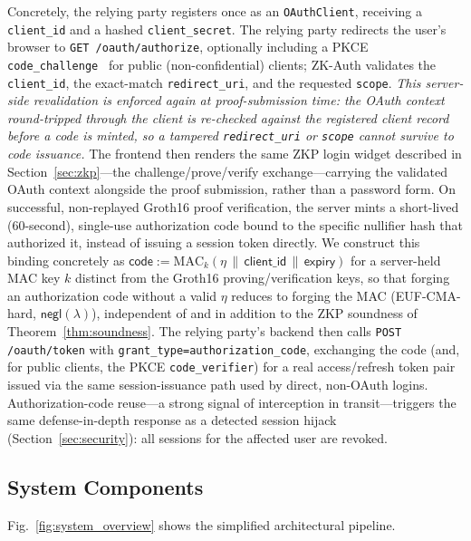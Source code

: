 \documentclass[journal,twoside,10pt]{IEEEtran}
\begin{document}
Concretely, the relying party registers once as an \texttt{OAuthClient},
receiving a \texttt{client\_id} and a hashed \texttt{client\_secret}.
The relying party redirects the user's browser to
\texttt{GET /oauth/authorize}, optionally including a PKCE
\texttt{code\_challenge}~\cite{rfc7636} for public (non-confidential)
clients; ZK-Auth validates the \texttt{client\_id}, the exact-match
\texttt{redirect\_uri}, and the requested \texttt{scope}. \emph{This
server-side revalidation is enforced again at proof-submission time: the
OAuth context round-tripped through the client is re-checked against the
registered client record before a code is minted, so a tampered
\texttt{redirect\_uri} or \texttt{scope} cannot survive to code issuance.}
The frontend then renders the same ZKP login widget described in
Section~\ref{sec:zkp}---the challenge/prove/verify exchange---carrying
the validated OAuth context alongside the proof submission, rather than
a password form. On successful, non-replayed Groth16 proof verification,
the server mints a short-lived (60-second), single-use authorization
code bound to the specific nullifier hash that authorized it, instead of
issuing a session token directly. We construct this binding concretely
as $\mathsf{code} := \mathrm{MAC}_k(\eta \,\|\, \mathsf{client\_id} \,\|\,
\mathsf{expiry})$ for a server-held MAC key $k$ distinct from the Groth16
proving/verification keys, so that forging an authorization code without
a valid $\eta$ reduces to forging the MAC (EUF-CMA-hard,
$\mathsf{negl}(\lambda)$), independent of and in addition to the ZKP
soundness of Theorem~\ref{thm:soundness}. The relying party's backend then
calls \texttt{POST /oauth/token} with
\texttt{grant\_type=authorization\_code}, exchanging the code (and, for
public clients, the PKCE \texttt{code\_verifier}) for a real
access/refresh token pair issued via the same session-issuance path used
by direct, non-OAuth logins. Authorization-code reuse---a strong signal
of interception in transit---triggers the same defense-in-depth response
as a detected session hijack (Section~\ref{sec:security}): all sessions
for the affected user are revoked.

\subsection{System Components}
Fig.~\ref{fig:system_overview} shows the simplified architectural pipeline.
\end{document}
